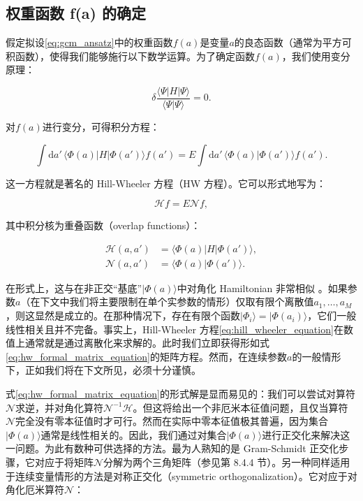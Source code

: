 \subsection{权重函数 f(a) 的确定}

假定拟设\ref{eq:gcm_ansatz}中的权重函数$f(a)$是变量$a$的良态函数（通常为平方可积函数），使得我们能够施行以下数学运算。为了确定函数$f(a)$，我们使用变分原理：

\begin{equation}
\delta\frac{\langle\Psi|H|\Psi\rangle}{\langle\Psi|\Psi\rangle}=0.\label{eq:gcm_variational_principle}
\end{equation}

对$f(a)$进行变分，可得积分方程：

\begin{equation}
\int\mathrm{d}a'\,\langle\Phi(a)|H|\Phi(a')\rangle f(a')=E\int\mathrm{d}a'\,\langle\Phi(a)|\Phi(a')\rangle f(a').\label{eq:hill_wheeler_equation}
\end{equation}

这一方程就是著名的 Hill-Wheeler 方程（HW 方程）\cite{HW53}。它可以形式地写为：

\begin{equation}
\mathscr{H}f=E\mathscr{N}f,\label{eq:hw_formal_matrix_equation}
\end{equation}

其中积分核为重叠函数（overlap functions）：

\begin{align}
\mathscr{H}(a,a') & =\langle\Phi(a)|H|\Phi(a')\rangle,\nonumber \\
\mathscr{N}(a,a') & =\langle\Phi(a)|\Phi(a')\rangle.\label{eq:overlap_functions_kernels}
\end{align}

在形式上，这与在非正交``基底''$|\Phi(a)\rangle$中对角化 Hamiltonian 非常相似 \cite{Wo70}。如果参数$a$（在下文中我们将主要限制在单个实参数的情形）仅取有限个离散值$a_{1},\dots,a_{M}$，则这显然是成立的。在那种情况下，存在有限个函数$|\Phi_{i}\rangle=|\Phi(a_{i})\rangle$，它们一般线性相关且并不完备。事实上，Hill-Wheeler
方程\ref{eq:hill_wheeler_equation}在数值上通常就是通过离散化来求解的。此时我们立即获得形如式\ref{eq:hw_formal_matrix_equation}的矩阵方程。然而，在连续参数$a$的一般情形下，正如我们将在下文所见，必须十分谨慎。

式\ref{eq:hw_formal_matrix_equation}的形式解是显而易见的：我们可以尝试对算符$\mathscr{N}$求逆，并对角化算符$\mathscr{N}^{-1}\mathscr{H}$。但这将给出一个非厄米本征值问题，且仅当算符$\mathscr{N}$完全没有零本征值时才可行。然而在实际中零本征值极其普遍，因为集合$|\Phi(a)\rangle$通常是线性相关的。因此，我们通过对集合$|\Phi(a)\rangle$进行正交化来解决这一问题。为此有数种可供选择的方法。最为人熟知的是
Gram-Schmidt 正交化步骤，它对应于将矩阵$\mathscr{N}$分解为两个三角矩阵（参见第 8.4.4 节）。另一种同样适用于连续变量情形的方法是对称正交化（symmetric
orthogonalization）。它对应于对角化厄米算符$\mathscr{N}$：

